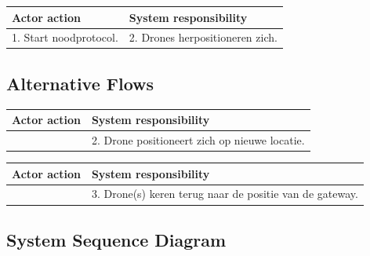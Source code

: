 \documentclass[a4paper, 11pt, oneside]{report}
\begin{document}
\begin{table}[H]
	\centering
	\begin{tabular}{|l|l|}
		\hline
		\rowcolor[HTML]{C0C0C0} 
		Actor action  & System responsibility   \\ \hline
		1. Start noodprotocol. &  2. Drones herpositioneren zich.\\ \hline
	\end{tabular}
\end{table}

\subsection{Alternative Flows}


\begin{table}[H]
	\centering
	\begin{tabular}{|l|l|}
		\hline
		\rowcolor[HTML]{C0C0C0} 
		Actor action  & System responsibility   \\ \hline
	    &  2. Drone positioneert zich op nieuwe locatie.     \\ \hline
	\end{tabular}
\end{table}

\begin{table}[H]
	\centering
	\begin{tabular}{|l|l|}
		\hline
		\rowcolor[HTML]{C0C0C0} 
		Actor action  & System responsibility   \\ \hline
		&  3. Drone(s) keren terug naar de positie van de gateway. \\ \hline
	\end{tabular}
\end{table}

\subsection{System Sequence Diagram }
\label{Usecase:noodprotocol:systemsequence}
\end{document}
